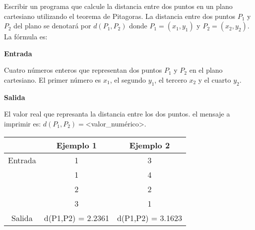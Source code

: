 
\question Escribir un programa que calcule la distancia entre dos puntos en
          un plano cartesiano utilizando el teorema de Pitagoras. La
          distancia entre dos puntos $P_1$ y $P_2$ del plano se denotará por
          $d(P_1,P_2)$ donde $P_1=(x_1,y_1)$ y $P_2=(x_2,y_2)$. La fórmula es:


\textbf{Entrada}

Cuatro números enteros que representan dos puntos $P_1$ y $P_2$ en el plano
cartesiano. El primer número es $x_1$, el segundo $y_1$, el tercero $x_2$ y
el cuarto $y_2$.

\textbf{Salida}

El valor real que represanta la distancia entre los dos puntos. el mensaje a
imprimir es: $d(P_1,P_2)=$<valor\_numérico>.

\begin{center}
  \begin{tabular}{|c|c|c|}
     \hline
     \rowcolor[HTML]{C0C0C0}
             & Ejemplo 1 & Ejemplo 2 \\
     \hline
     Entrada & 1         &  3 \\
             & 1         &  4 \\
             & 2         &  2 \\
             & 3         &  1 \\
     \hline
     Salida  & d(P1,P2) = 2.2361 & d(P1,P2) = 3.1623 \\
     \hline
  \end{tabular}
\end{center}
          
